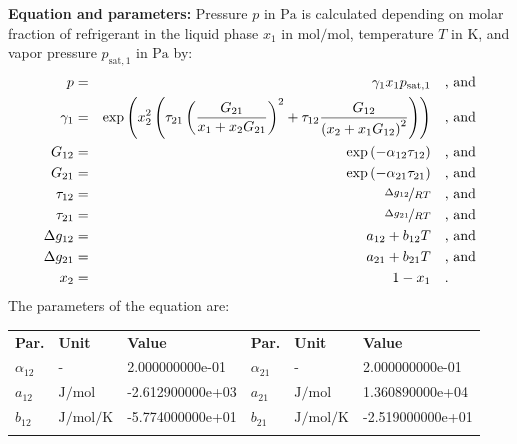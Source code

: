 \textbf{Equation and parameters:}
\newline
%
Pressure $p$ in $\si{\pascal}$ is calculated depending on molar fraction of refrigerant in the liquid phase $x_1$ in $\si{\mole\per\mole}$, temperature $T$ in $\si{\kelvin}$, and vapor pressure $p_\mathrm{sat,1}$ in $\si{\pascal}$ by:
%
\begin{equation*}
\begin{split}
p &=& \gamma_1 x_1 p_\mathrm{sat,1} & \quad\text{, and} \\
\gamma_1 &=& \exp \left( x_2^2 \left( \tau_{21} \left( \frac{G_{21}}{x_1 + x_2 G_{21}} \right) ^2 + \tau_{12} \frac{G_{12}}{\left( x_2 + x_1 G_{12} \right) ^2}\right) \right) & \quad\text{, and} \\
G_{12} &=& \exp \left( -\alpha_{12} \tau_{12} \right) & \quad\text{, and} \\
G_{21} &=& \exp \left( -\alpha_{21} \tau_{21} \right) & \quad\text{, and} \\
\tau_{12} &=& \nicefrac{\Delta g_{12}}{R T} & \quad\text{, and} \\
\tau_{21} &=& \nicefrac{\Delta g_{21}}{R T} & \quad\text{, and} \\
\Delta g_{12} &=& a_{12} + b_{12} T & \quad\text{, and} \\
\Delta g_{21} &=& a_{21} + b_{21} T & \quad\text{, and} \\
x_2 &=& 1 - x_1  & \quad\text{.} \\
\end{split}
\end{equation*}
%
The parameters of the equation are:
%
\begin{longtable}[l]{lll|lll}
\toprule
\addlinespace
\textbf{Par.} & \textbf{Unit} & \textbf{Value} &	\textbf{Par.} & \textbf{Unit} & \textbf{Value} \\
\addlinespace
\midrule
\endhead

\bottomrule
\endfoot
\bottomrule
\endlastfoot
\addlinespace

$\alpha_{12}$ & - & 2.000000000e-01 & $\alpha_{21}$ & - & 2.000000000e-01 \\
$a_{12}$ & $\si{\joule\per\mole}$ & -2.612900000e+03 & $a_{21}$ & $\si{\joule\per\mole}$ & 1.360890000e+04 \\
$b_{12}$ & $\si{\joule\per\mole\per\kelvin}$ & -5.774000000e+01 & $b_{21}$ & $\si{\joule\per\mole\per\kelvin}$ & -2.519000000e+01 \\

\addlinespace\end{longtable}

